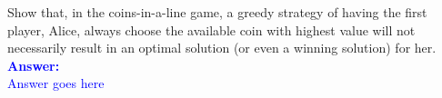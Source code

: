 \item{}
Show that, in the coins-in-a-line game, a greedy strategy of having the first
player, Alice, always choose the available coin with highest value will not
necessarily result in an optimal solution (or even a winning solution) for her.
\\[12pt]
\ifanswers
\textcolor{blue}{
\textbf{Answer:}\\[6pt]
Answer goes here
}
\newpage
\fi
